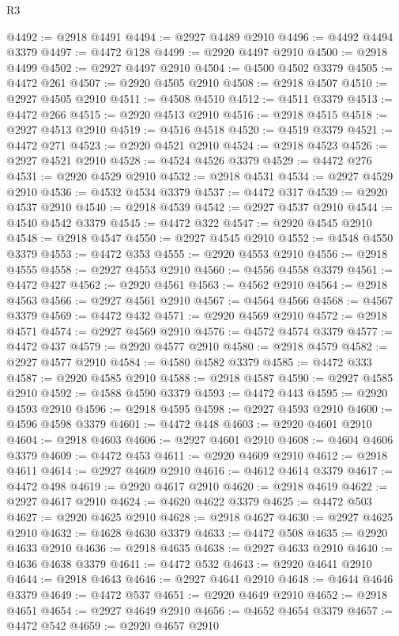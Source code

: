 \begin{lexlean}{R3}
\begin{coremodule}
@4492 := @2918 @4491
@4494 := @2927 @4489 @2910
@4496 := @4492 @4494 @3379
@4497 := @4472 @128
@4499 := @2920 @4497 @2910
@4500 := @2918 @4499
@4502 := @2927 @4497 @2910
@4504 := @4500 @4502 @3379
@4505 := @4472 @261
@4507 := @2920 @4505 @2910
@4508 := @2918 @4507
@4510 := @2927 @4505 @2910
@4511 := @4508 @4510
@4512 := @4511 @3379
@4513 := @4472 @266
@4515 := @2920 @4513 @2910
@4516 := @2918 @4515
@4518 := @2927 @4513 @2910
@4519 := @4516 @4518
@4520 := @4519 @3379
@4521 := @4472 @271
@4523 := @2920 @4521 @2910
@4524 := @2918 @4523
@4526 := @2927 @4521 @2910
@4528 := @4524 @4526 @3379
@4529 := @4472 @276
@4531 := @2920 @4529 @2910
@4532 := @2918 @4531
@4534 := @2927 @4529 @2910
@4536 := @4532 @4534 @3379
@4537 := @4472 @317
@4539 := @2920 @4537 @2910
@4540 := @2918 @4539
@4542 := @2927 @4537 @2910
@4544 := @4540 @4542 @3379
@4545 := @4472 @322
@4547 := @2920 @4545 @2910
@4548 := @2918 @4547
@4550 := @2927 @4545 @2910
@4552 := @4548 @4550 @3379
@4553 := @4472 @353
@4555 := @2920 @4553 @2910
@4556 := @2918 @4555
@4558 := @2927 @4553 @2910
@4560 := @4556 @4558 @3379
@4561 := @4472 @427
@4562 := @2920 @4561
@4563 := @4562 @2910
@4564 := @2918 @4563
@4566 := @2927 @4561 @2910
@4567 := @4564 @4566
@4568 := @4567 @3379
@4569 := @4472 @432
@4571 := @2920 @4569 @2910
@4572 := @2918 @4571
@4574 := @2927 @4569 @2910
@4576 := @4572 @4574 @3379
@4577 := @4472 @437
@4579 := @2920 @4577 @2910
@4580 := @2918 @4579
@4582 := @2927 @4577 @2910
@4584 := @4580 @4582 @3379
@4585 := @4472 @333
@4587 := @2920 @4585 @2910
@4588 := @2918 @4587
@4590 := @2927 @4585 @2910
@4592 := @4588 @4590 @3379
@4593 := @4472 @443
@4595 := @2920 @4593 @2910
@4596 := @2918 @4595
@4598 := @2927 @4593 @2910
@4600 := @4596 @4598 @3379
@4601 := @4472 @448
@4603 := @2920 @4601 @2910
@4604 := @2918 @4603
@4606 := @2927 @4601 @2910
@4608 := @4604 @4606 @3379
@4609 := @4472 @453
@4611 := @2920 @4609 @2910
@4612 := @2918 @4611
@4614 := @2927 @4609 @2910
@4616 := @4612 @4614 @3379
@4617 := @4472 @498
@4619 := @2920 @4617 @2910
@4620 := @2918 @4619
@4622 := @2927 @4617 @2910
@4624 := @4620 @4622 @3379
@4625 := @4472 @503
@4627 := @2920 @4625 @2910
@4628 := @2918 @4627
@4630 := @2927 @4625 @2910
@4632 := @4628 @4630 @3379
@4633 := @4472 @508
@4635 := @2920 @4633 @2910
@4636 := @2918 @4635
@4638 := @2927 @4633 @2910
@4640 := @4636 @4638 @3379
@4641 := @4472 @532
@4643 := @2920 @4641 @2910
@4644 := @2918 @4643
@4646 := @2927 @4641 @2910
@4648 := @4644 @4646 @3379
@4649 := @4472 @537
@4651 := @2920 @4649 @2910
@4652 := @2918 @4651
@4654 := @2927 @4649 @2910
@4656 := @4652 @4654 @3379
@4657 := @4472 @542
@4659 := @2920 @4657 @2910

\end{coremodule}
\end{lexlean}
